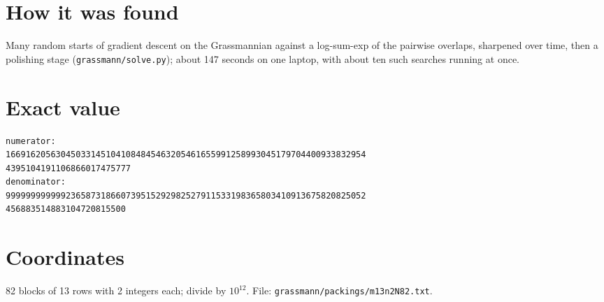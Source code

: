 \documentclass[11pt,a4paper]{article}
\begin{document}
\section{How it was found}
Many random starts of gradient descent on the Grassmannian against a log-sum-exp of the pairwise overlaps, sharpened over time, then a polishing stage (\texttt{grassmann/solve.py}); about 147 seconds on one laptop, with about ten such searches running at once.


\appendix
\section{Exact value}
{\small
\begin{verbatim}
numerator:
166916205630450331451041084845463205461655991258993045179704400933832954
4395104191106866017475777
denominator:
999999999999236587318660739515292982527911533198365803410913675820825052
456883514883104720815500
\end{verbatim}}

\section{Coordinates}
82 blocks of 13 rows with 2 integers each; divide by $10^{12}$. File: \texttt{grassmann/packings/m13n2N82.txt}.
{\tiny
\begin{multicols}{4}
\end{multicols}}
\end{document}
